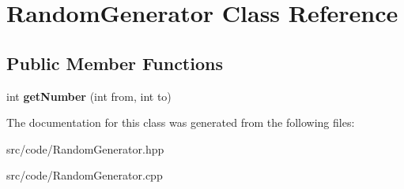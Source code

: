 \hypertarget{class_random_generator}{}\section{Random\+Generator Class Reference}
\label{class_random_generator}
\subsection*{Public Member Functions}
\begin{DoxyCompactItemize}
\item 
\mbox{\label{class_random_generator_a77913071c97c0904ffda94b2d815e6f5}} 
int {\bfseries get\+Number} (int from, int to)
\end{DoxyCompactItemize}


The documentation for this class was generated from the following files\+:\begin{DoxyCompactItemize}
\item 
src/code/Random\+Generator.\+hpp\item 
src/code/Random\+Generator.\+cpp\end{DoxyCompactItemize}
